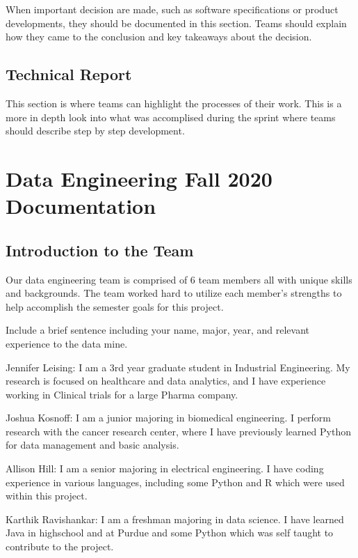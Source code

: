 \documentclass[]{book}
\begin{document}
When important decision are made, such as software specifications or
product developments, they should be documented in this section. Teams
should explain how they came to the conclusion and key takeaways about
the decision.

\section{Technical Report}\label{technical-report}

This section is where teams can highlight the processes of their work.
This is a more in depth look into what was accomplised during the sprint
where teams should describe step by step development.

\chapter{Data Engineering Fall 2020
Documentation}\label{data-engineering-fall-2020-documentation}

\section{Introduction to the Team}\label{introduction-to-the-team}

Our data engineering team is comprised of 6 team members all with unique
skills and backgrounds. The team worked hard to utilize each member's
strengths to help accomplish the semester goals for this project.

Include a brief sentence including your name, major, year, and relevant
experience to the data mine.

Jennifer Leising: I am a 3rd year graduate student in Industrial
Engineering. My research is focused on healthcare and data analytics,
and I have experience working in Clinical trials for a large Pharma
company.

Joshua Kosnoff: I am a junior majoring in biomedical engineering. I
perform research with the cancer research center, where I have
previously learned Python for data management and basic analysis.

Allison Hill: I am a senior majoring in electrical engineering. I have
coding experience in various languages, including some Python and R
which were used within this project.

Karthik Ravishankar: I am a freshman majoring in data science. I have
learned Java in highschool and at Purdue and some Python which was self
taught to contribute to the project.
\end{document}
